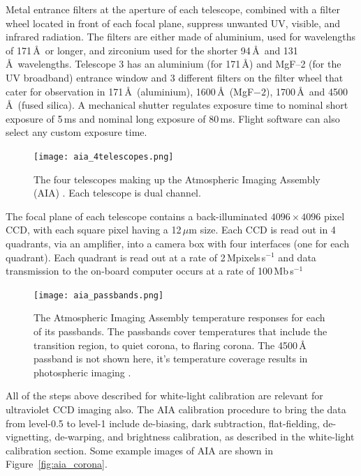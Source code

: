 Metal entrance filters at the aperture of each telescope, combined with a filter wheel located in front of each focal plane, suppress unwanted UV, visible, and infrared radiation. The filters are either made of aluminium, used for wavelengths of 171\,\AA~or longer, and zirconium used for the shorter 94\,\AA~and 131\,\AA~wavelengths. Telescope 3 has an aluminium (for 171\,\AA) and MgF--2 (for the UV broadband) entrance window and 3 different filters on the filter wheel that cater for observation in 171\,\AA~(aluminium), 1600\,\AA~(MgF$-2$), 1700\,\AA~and 4500\,\AA~(fused silica). A mechanical shutter regulates exposure time to nominal short exposure of 5\,ms and nominal long exposure of 80\,ms. Flight software can also select any custom exposure time.
\begin{figure}[!t]
\begin{center}
\texttt{[image: aia\_4telescopes.png]}
\caption[The four telescopes of AIA]{The four telescopes making up the Atmospheric Imaging Assembly (AIA) \citep{lemen2012}. Each telescope is dual channel.}
\label{fig:aia_four_tel}
\end{center}
\end{figure}
The focal plane of each telescope contains a back-illuminated $4096\times4096$ pixel CCD, with each square pixel having a 12\,$\mu$m size. Each CCD is read out in 4 quadrants, via an amplifier, into a camera box with four interfaces (one for each quadrant). Each quadrant is read out at a rate of 2\,Mpixels\,s$^{-1}$ and data transmission to the on-board computer occurs at a rate of 100\,Mb\,s$^{-1}$
\begin{figure}[!t]
\begin{center}
\texttt{[image: aia\_passbands.png]}
\caption[AIA temperature response]{The Atmospheric Imaging Assembly temperature responses for each of its passbands. The passbands cover temperatures that include the transition region, to quiet corona, to flaring corona. The 4500\,\AA~ passband is not shown here, it's temperature coverage results in photospheric imaging \citep{lemen2012}.}
\label{fig:aia_pass}
\end{center}
\end{figure}
All of the steps above described for white-light calibration are relevant for ultraviolet CCD imaging also. The AIA calibration procedure to bring the data from level-0.5 to level-1 include de-biasing, dark subtraction, flat-fielding, de-vignetting, de-warping, and brightness calibration, as described in the white-light calibration section. Some example images of AIA are shown in Figure~\ref{fig:aia_corona}.

